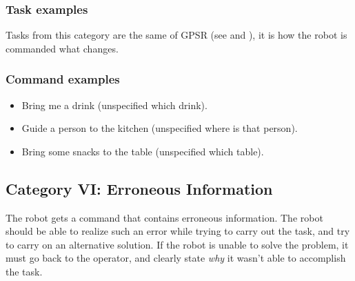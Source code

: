 % 

\subsubsection{Task examples}
Tasks from this category are the same of GPSR (see  and ), it is how the robot is commanded what changes.

\subsubsection{Command examples}
\begin{itemize}
	\item Bring me a drink (unspecified which drink).
	\item Guide a person to the kitchen (unspecified where is that person).
	\item Bring some snacks to the table (unspecified which table).
\end{itemize}



%
%
\subsection{Category VI: Erroneous Information}
\label{sec:eegpsr-category6-explained}
The robot gets a command that contains erroneous information. The robot should be able to realize such an error while trying to carry out the task, and try to carry on an alternative solution. If the robot is unable to solve the problem, it must go back to the operator, and clearly state \textit{why} it wasn't able to accomplish the task.

